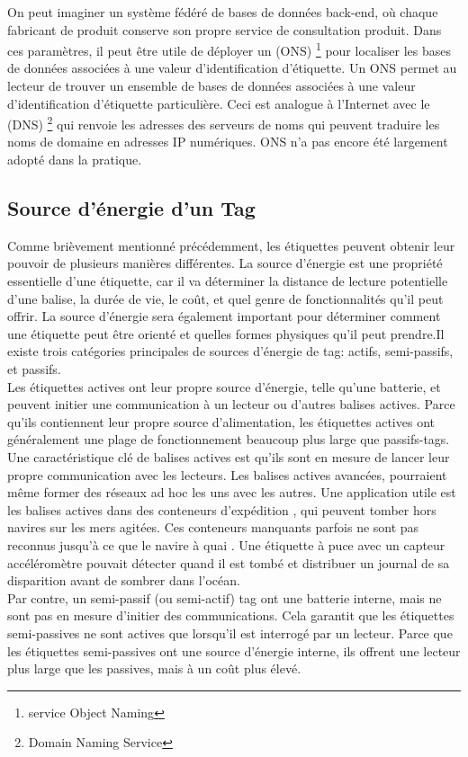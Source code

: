 \documentclass[11pt, a4paper, twoside]{book}
\begin{document}
On peut imaginer un système fédéré de bases de données back-end, où chaque fabricant de produit conserve son propre service de consultation produit. Dans ces paramètres, il peut être utile de déployer un (ONS) \footnote{service Object Naming} pour localiser les bases de données associées à une valeur d'identification d'étiquette. Un ONS permet au lecteur de trouver un ensemble de bases de données associées à une valeur d'identification d'étiquette particulière. Ceci est analogue à l'Internet avec le (DNS) \footnote{Domain Naming Service} qui renvoie les adresses des serveurs de noms qui peuvent traduire les noms de domaine en adresses IP numériques. ONS n'a pas encore été largement adopté dans la pratique.
\subsection{Source d'énergie d'un Tag}
Comme brièvement mentionné précédemment, les étiquettes peuvent obtenir leur pouvoir de plusieurs manières différentes. La source d'énergie est une propriété essentielle d'une étiquette, car il va déterminer la distance de lecture potentielle d'une balise, la durée de vie, le coût, et quel genre de fonctionnalités qu'il peut offrir. La source d'énergie sera également important pour déterminer comment une étiquette peut être orienté et quelles formes physiques qu'il peut prendre.Il existe trois catégories principales de sources d'énergie de tag: actifs, semi-passifs, et passifs.\\

 Les étiquettes actives ont leur propre source d'énergie, telle qu'une batterie, et peuvent initier une communication à un lecteur ou d'autres balises actives. Parce qu'ils contiennent leur propre source d'alimentation, les étiquettes actives ont généralement une plage de fonctionnement beaucoup plus large que passifs-tags. Une caractéristique clé de balises actives est qu'ils sont en mesure de lancer leur propre communication avec les lecteurs. Les balises actives avancées, pourraient même former des réseaux ad hoc les uns avec les autres. Une application utile est les balises actives dans des conteneurs d'expédition , qui peuvent tomber hors navires sur les mers agitées. Ces conteneurs manquants parfois ne sont pas reconnus jusqu'à ce que le navire à quai . Une étiquette à puce avec un capteur accéléromètre pouvait détecter quand il est tombé et distribuer un journal de sa disparition avant de sombrer dans l'océan.\\

Par contre, un semi-passif (ou semi-actif) tag ont une batterie interne, mais ne sont pas en mesure d'initier des communications. Cela garantit que les étiquettes semi-passives ne sont actives que lorsqu'il est interrogé par un lecteur. Parce que les étiquettes semi-passives ont une source d'énergie interne, ils offrent une lecteur plus large que les passives, mais à un coût plus élevé.\\
\end{document}
